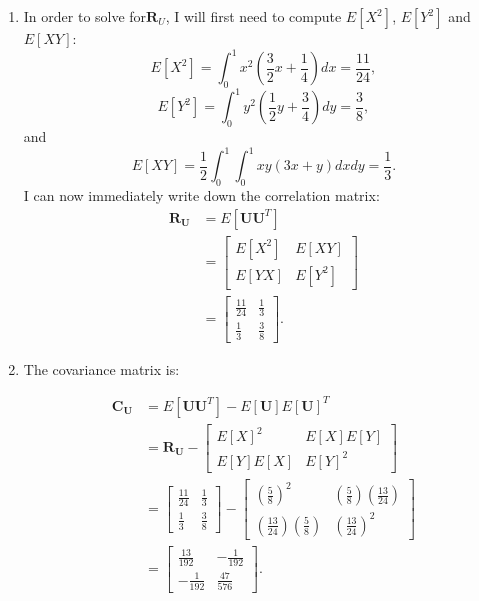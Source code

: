 \begin{problem}{13}
\begin{enumerate}
\item In order to solve for$\bm R_U$, I will first need to compute $E[X^2]$, $E[Y^2]$ and $E[XY]$:
\begin{equation*}
E[X^2] = \int_0^1x^2 \left(\frac{3}{2}x+\frac{1}{4} \right)dx = \frac{11}{24},
\end{equation*}
\begin{equation*}
E[Y^2] = \int_0^1y^2 \left(\frac{1}{2}y+\frac{3}{4} \right)dy = \frac{3}{8},
\end{equation*}
and
\begin{equation*}
E[XY] = \frac{1}{2}\int_0^1 \int_0^1xy (3x+y)dxdy = \frac{1}{3}.
\end{equation*}
I can now immediately write down the correlation matrix:
\begin{align*}
\bm{R_U}  &= E[\bm U \bm U^T] \\
& = \left[\begin{matrix}
    E[X^2] & E[XY] \\
    E[YX] & E[Y^2] 
\end{matrix}\right] \\
&= \left[\begin{matrix}
    \frac{11}{24} & \frac{1}{3} \\[6pt]
    \frac{1}{3} & \frac{3}{8} 
\end{matrix}\right].
\end{align*}

\item  The covariance matrix is:

\begin{align*}
\bm{C_U}  &= E[\bm U \bm U^T]-E[\bm U] E[\bm U]^T \\
& =\bm{R_U} - \left[\begin{matrix}
    E[X]^2 & E[X]E[Y] \\
    E[Y]E[X] & E[Y]^2 
\end{matrix}\right] \\
&= \left[\begin{matrix}
    \frac{11}{24} & \frac{1}{3} \\[6pt]
    \frac{1}{3} & \frac{3}{8} 
\end{matrix}\right] -
 \left[\begin{matrix}
    \left(\frac{5}{8}\right)^2 & \left(\frac{5}{8}\right) \left(\frac{13}{24}\right) \\[6pt]
    \left(\frac{13}{24}\right)\left(\frac{5}{8}\right) & \left(\frac{13}{24}\right)^2 
\end{matrix}\right]  \\
&= \left[\begin{matrix}
    \frac{13}{192} & -\frac{1}{192} \\[6pt]
    -\frac{1}{192} & \frac{47}{576}
\end{matrix}\right].
\end{align*}

\end{enumerate}
\end{problem}



